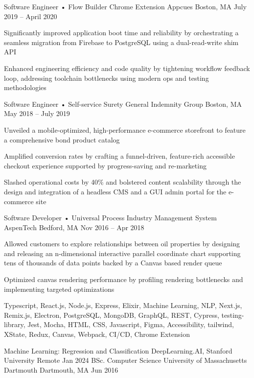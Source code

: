 \documentclass[]{awesome-cv}
\begin{document}
\begin{cventries}
	{Software Engineer • Flow Builder Chrome Extension}
	{Appcues}
	{Boston, MA}
	{July 2019 – April 2020}
	{\begin{cvitems}
		\item {Significantly improved application boot time and reliability by orchestrating a seamless migration from Firebase to PostgreSQL using a dual-read-write shim API}
		\item {Enhanced engineering efficiency and code quality by tightening workflow feedback loop, addressing toolchain bottlenecks using modern ops and testing methodologies}
		\end{cvitems}}
	\cventry
	{Software Engineer • Self-service Surety}
	{General Indemnity Group}
	{Boston, MA}
	{May 2018 – July 2019}
	{\begin{cvitems}
		\item {Unveiled a mobile-optimized, high-performance e-commerce storefront to feature a comprehensive bond product catalog}
		\item {Amplified conversion rates by crafting a funnel-driven, feature-rich accessible checkout experience supported by progress-saving and re-marketing}
		\item {Slashed operational costs by 40\% and bolstered content scalability through the design and integration of a headless CMS and a GUI admin portal for the e-commerce site}
		\end{cvitems}}
	\cventry
	{Software Developer • Universal Process Industry Management System} 
	{AspenTech}
	{Bedford, MA}
	{Nov 2016 – Apr 2018}
	{\begin{cvitems}
		\item {Allowed customers to explore relationships between oil properties by designing and releasing an n-dimensional interactive parallel coordinate chart supporting tens of thousands of data points backed by a Canvas based render queue}
		\item {Optimized canvas rendering performance by profiling rendering bottlenecks and implementing targeted optimizations}
		\end{cvitems}}
\end{cventries}

\vspace{-2mm}

Typescript, React.js, Node.js, Express, Elixir, Machine Learning, NLP, Next.js, Remix.js, Electron, PostgreSQL, MongoDB, GraphQL, REST, Cypress, testing-library, Jest, Mocha, HTML, CSS, Javascript, Figma, Accessibility, tailwind, XState, Redux, Canvas, Webpack, CI/CD, Chrome Extension

\begin{cvhonors}
	\cvhonor
	{Machine Learning: Regression and Classification}
	{DeepLearning.AI, Stanford University}
	{Remote}
	{Jan 2024}
	\cvhonor
	{BSc. Computer Science}
	{University of Massachusetts Dartmouth}
	{Dartmouth, MA}
	{Jun 2016}
\end{cvhonors}
\end{document}
